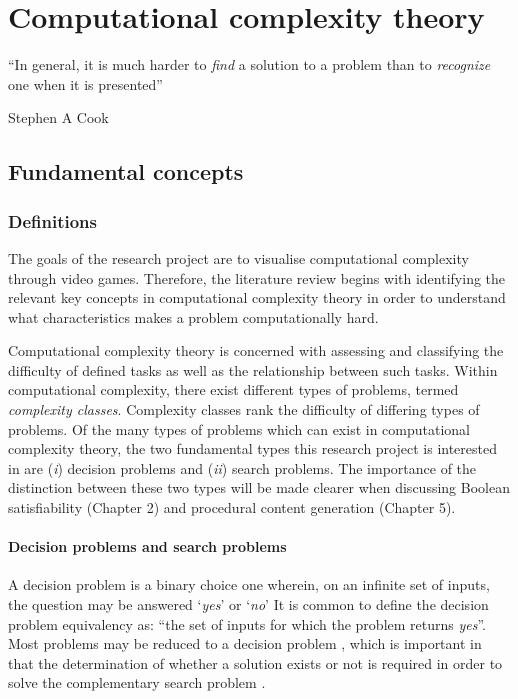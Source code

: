 \documentclass[11pt, a4paper, oneside]{report} %
\begin{document}

\chapter{Computational complexity theory}

\epigraph{``In general, it is much harder to \textit{find} a solution to a problem than to
\textit{recognize} one when it is presented''}{Stephen A Cook \cite{cook1984can}}

\section{Fundamental concepts}

\subsection{Definitions}

The goals of the research project are to visualise computational complexity
through video games. Therefore, the literature review begins with identifying
the relevant key concepts in computational complexity theory in order to
understand what characteristics makes a problem computationally hard.

Computational complexity theory is concerned with assessing and classifying the
difficulty of defined tasks as well as the relationship between such tasks.
Within computational complexity, there exist different types of problems, termed
\textit{complexity classes}. Complexity classes rank the difficulty of differing
types of problems. Of the many types of problems which can exist in
computational complexity theory, the two fundamental types this research project
is interested in are (\textit{i}) decision problems and (\textit{ii}) search
problems. The importance of the distinction between these two types will be made
clearer when discussing Boolean satisfiability (Chapter 2) and procedural
content generation (Chapter 5).

\subsubsection{Decision problems and search problems}

A decision problem is a binary choice one wherein, on an infinite set of inputs,
the question may be answered `\textit{yes}' or `\textit{no}'  It is common  to
define the decision problem equivalency as: ``the set of inputs for which the
problem returns \textit{yes}''. Most problems may be reduced to a decision
problem \cite{kendall2008survey}, which is important in that the determination
of whether a solution exists or not is required in order to solve the
complementary search problem \cite{Goldreich:2008}.
\end{document}
